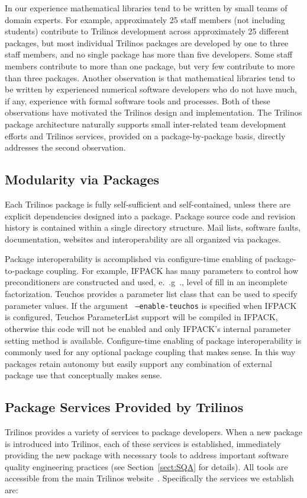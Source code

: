 \documentclass[acmtoms,acmnow]{acmtrans2m}
\begin{document}
In our experience mathematical libraries tend to be written by small
teams of domain experts.  For example, approximately 25 staff
members (not including students) contribute to Trilinos development 
across approximately 25
different packages, but most individual Trilinos packages
are developed by one to three staff members, and no single package 
has more than five
developers.   Some staff members contribute to more than one package,
but very few contribute to more than three packages.  Another
observation is that mathematical libraries tend to be written
by experienced numerical software
developers who do not have much, if any, experience with formal
software tools and processes.  Both of these observations have
motivated the Trilinos design and implementation.  The Trilinos
package architecture naturally supports small inter-related team
development efforts and Trilinos services, provided on a
package-by-package basis, directly addresses the second observation.

\subsection{Modularity via Packages}
Each Trilinos package is fully self-sufficient and self-contained,
unless there are explicit dependencies designed into a package.
Package source code and revision history is contained within a single directory
structure.  Mail lists, software faults, documentation, websites and
interoperability are all organized via packages.  

Package
interoperability is accomplished via configure-time enabling of
package-to-package coupling.  For example, IFPACK has many parameters
to control how preconditioners are constructed and used, e.~.g~.,
level of fill in an incomplete factorization.  Teuchos provides a
parameter list class that can be used to specify parameter values.
If the argument {\tt
--enable-teuchos} is specified when IFPACK is configured, Teuchos
ParameterList support will be compiled in IFPACK, otherwise this code
will not be enabled and only IFPACK's internal parameter setting
method is available.  Configure-time enabling of package
interoperability is commonly used for any optional package coupling
that makes sense.  In this way packages retain autonomy but easily
support any combination of external package use that conceptually makes sense. 
 
\subsection{Package Services Provided by Trilinos}
Trilinos provides a variety of services to package
developers.  When a new package is introduced into Trilinos, each of
these services is established, immediately providing the new package
with necessary tools to address important software quality engineering
practices (see Section~\ref{sect:SQA} for details).  All tools are 
accessible from the main Trilinos website~\cite{Trilinos-home-page}.
Specifically the services we establish are: 
\end{document}
